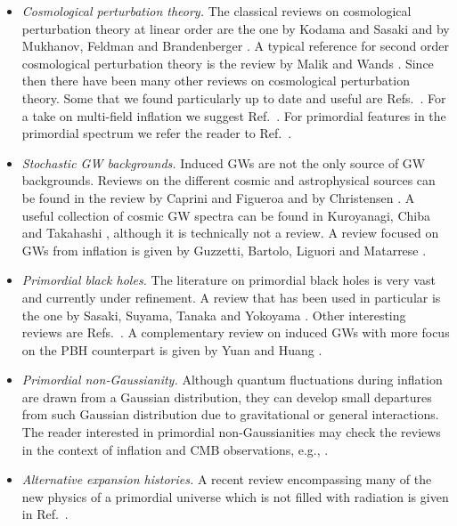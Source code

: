 \documentclass[a4paper,11pt]{article}
\numberwithin{equation}{section}
\begin{document}
\begin{itemize}
\item\textit{Cosmological perturbation theory.} The classical reviews on cosmological perturbation theory at linear order are the one by Kodama and Sasaki \cite{Kodama:1985bj} and by Mukhanov, Feldman and Brandenberger \cite{Mukhanov:1990me}. A typical reference for second order cosmological perturbation theory is the review by Malik and Wands \cite{Malik:2008im}. Since then there have been many other reviews on cosmological perturbation theory. Some that we found particularly up to date and useful are Refs.~\cite{Durrer:2004fx,Langlois:2010xc,Baumann:2009ds,Piattella:2018hvi}. For a take on multi-field inflation we suggest Ref.~\cite{Gong:2016qmq}. For primordial features in the primordial spectrum we refer the reader to Ref.~\cite{Chen:2011zf}.
\item\textit{Stochastic GW backgrounds.} Induced GWs are not the only source of GW backgrounds. Reviews on the different cosmic and astrophysical sources can be found in the review by Caprini and Figueroa \cite{Caprini:2018mtu} and by Christensen \cite{Christensen:2018iqi}. A useful collection of cosmic GW spectra can be found in Kuroyanagi, Chiba and Takahashi \cite{Kuroyanagi:2018csn}, although it is technically not a review. A review focused on GWs from inflation is given by Guzzetti, Bartolo, Liguori and Matarrese \cite{Guzzetti:2016mkm}.
\item\textit{Primordial black holes.} The literature on primordial black holes is very vast and currently under refinement. A review that has been used in particular is the one by Sasaki, Suyama, Tanaka and Yokoyama \cite{Sasaki:2018dmp}. Other interesting reviews are Refs.~\cite{Khlopov:2008qy,Carr:2020gox,Carr:2020xqk,Green:2020jor}. A complementary review on induced GWs with more focus on the PBH counterpart is given by Yuan and Huang \cite{Yuan:2021qgz}.
\item\textit{Primordial non-Gaussianity.} Although quantum fluctuations during inflation are drawn from a Gaussian distribution, they can develop small departures from such Gaussian distribution due to gravitational or general interactions. The reader interested in primordial non-Gaussianities may check the reviews in the context of inflation and CMB observations, e.g., \cite{Komatsu:2010hc,Bartolo:2010qu,Byrnes:2010em,Koyama:2010xj}. 
\item \textit{Alternative expansion histories.} A recent review encompassing many of the new physics of a primordial universe which is not filled with radiation is given in Ref.~\cite{Allahverdi:2020bys}.
\end{itemize}
\end{document}
